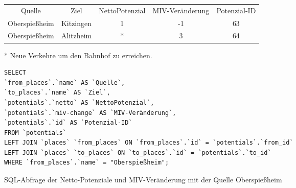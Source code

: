 \begin{tabular}{ c  c  c  c  c }
Quelle & Ziel & NettoPotenzial & MIV-Veränderung & Potenzial-ID\\ 
Oberspießheim & Kitzingen & 1 & -1 & 63\\ 
Oberspießheim & Alitzheim & * & 3 & 64\\ 
\end{tabular}
\newline
\newline
* Neue Verkehre um den Bahnhof zu erreichen.
\newline
\begin{listing}[htbp]
\begin{verbatim}
SELECT
`from_places`.`name` AS `Quelle`, 
`to_places`.`name` AS `Ziel`, 
`potentials`.`netto` AS `NettoPotenzial`, 
`potentials`.`miv-change` AS `MIV-Veränderung`, 
`potentials`.`id` AS `Potenzial-ID`
FROM `potentials`
LEFT JOIN `places` `from_places` ON `from_places`.`id` = `potentials`.`from_id`
LEFT JOIN `places` `to_places` ON `to_places`.`id` = `potentials`.`to_id`
WHERE `from_places`.`name` = "Oberspießheim";
\end{verbatim}
\caption{SQL-Abfrage der Netto-Potenziale und MIV-Veränderung mit der Quelle Oberspießheim}\label{lst-fz-oberspiessheim}
\end{listing}